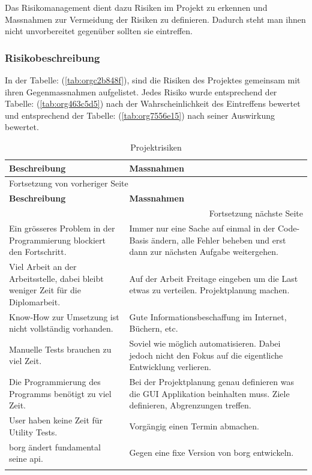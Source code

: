 Das Risikomanagement dient dazu Risiken im Projekt zu erkennen und Massnahmen
zur Vermeidung der Risiken zu definieren. Dadurch steht man ihnen nicht
unvorbereitet gegenüber sollten sie eintreffen.

\subsubsection{Risikobeschreibung}
\label{sec:orgfec4900}

In der Tabelle: (\ref{tab:orgc2b848f}), sind die Risiken des Projektes
gemeinsam mit ihren Gegenmassnahmen aufgelistet. Jedes Risiko wurde
entsprechend der Tabelle: (\ref{tab:org463c5d5}) nach der Wahrscheinlichkeit
des Eintreffens bewertet und entsprechend der Tabelle: (\ref{tab:org7556e15}) nach
seiner Auswirkung bewertet.

\begin{longtable}{|p{}|p{}|}
\hline
\textbf{Beschreibung}\cellcolor[HTML]{C0C0C0} & \textbf{Massnahmen}\cellcolor[HTML]{C0C0C0}\\
\hline
\endfirsthead
\multicolumn{2}{l}{Fortsetzung von vorheriger Seite} \\
\hline

\textbf{Beschreibung}\cellcolor[HTML]{C0C0C0} & \textbf{Massnahmen}\cellcolor[HTML]{C0C0C0} \\

\hline
\endhead
\hline\multicolumn{2}{r}{Fortsetzung nächste Seite} \\
\endfoot
\endlastfoot
\hline
Ein grösseres Problem in der Programmierung blockiert den Fortschritt. & Immer nur eine Sache auf einmal in der Code-Basis ändern, alle Fehler beheben und erst dann zur nächsten Aufgabe weitergehen.\\
\hline
Viel Arbeit an der Arbeitsstelle, dabei bleibt weniger Zeit für die Diplomarbeit. & Auf der Arbeit Freitage eingeben um die Last etwas zu verteilen. Projektplanung machen.\\
\hline
Know-How zur Umsetzung ist nicht vollständig vorhanden. & Gute Informationsbeschaffung im Internet, Büchern, etc.\\
\hline
Manuelle Tests brauchen zu viel Zeit. & Soviel wie möglich automatisieren. Dabei jedoch nicht den Fokus auf die eigentliche Entwicklung verlieren.\\
\hline
Die Programmierung des Programms benötigt zu viel Zeit. & Bei der Projektplanung genau definieren was die GUI Applikation beinhalten muss. Ziele definieren, Abgrenzungen treffen.\\
\hline
User haben keine Zeit für Utility Tests. & Vorgängig einen Termin abmachen.\\
\hline
\gls{borg} ändert fundamental seine \gls{api}. & Gegen eine fixe Version von \gls{borg} entwickeln.\\
\hline
\caption{\label{tab:orge163d32}
Projektrisiken}
\\
\end{longtable}

